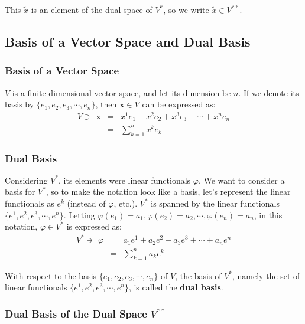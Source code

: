 \documentclass[uplatex,a4j,12pt,dvipdfmx]{jsarticle}
\begin{document}
This $\tilde{x}$ is an element of the dual space of $V^{*}$, so we write $\tilde{x} \in V^{**}$.


\subsection{Basis of a Vector Space and Dual Basis}

\subsubsection{Basis of a Vector Space}

$V$ is a finite-dimensional vector space, and let its dimension be $n$.
If we denote its basis by $\{ e_{1}, e_{2}, e_{3}, \cdots , e_{n} \}$,
then $\mathbf{x} \in V$ can be expressed as:
\[
	\begin{array}{rcl}
		V \ni \ \
		\mathbf{x}
		 & = &
		x^{1} e_{1} + x^{2} e_{2} + x^{3} e_{3} + \cdots + x^{n} e_{n}
		\\
		 & = &
		\displaystyle \sum_{k=1}^{n} x^{k} e_{k}
	\end{array}
\]

\subsubsection{Dual Basis}

Considering $V^{*}$, its elements were linear functionals $\varphi$.
We want to consider a basis for $V^{*}$, so to make the notation look like a basis, let's represent the linear functionals as $e^{k}$ (instead of $\varphi$, etc.).
$V^{*}$ is spanned by the linear functionals $\{ e^{1}, e^{2}, e^{3}, \cdots , e^{n} \}$.
Letting $\varphi(e_{1}) = a_{1}, \varphi(e_{2}) = a_{2}, \cdots ,\varphi(e_{n}) = a_{n}$,
in this notation, $\varphi \in V^{*}$ is expressed as:
\[
	\begin{array}{rcl}
		V^{*} \ni \ \ \varphi
		 & = &
		a_{1} e^{1} + a_{2} e^{2} + a_{3} e^{3} + \cdots + a_{n} e^{n}
		\\
		 & = &
		\displaystyle \sum_{k=1}^{n} a_{k} e^{k}
	\end{array}
\]

With respect to the basis
$\{ e_{1}, e_{2}, e_{3}, \cdots , e_{n} \}$
of $V$,
the basis of $V^{*}$,
namely the set of linear functionals
$\{ e^{1}, e^{2}, e^{3}, \cdots , e^{n} \}$,
is called the \textbf{dual basis}.

\subsubsection{Dual Basis of the Dual Space $V^{**}$}
\end{document}
